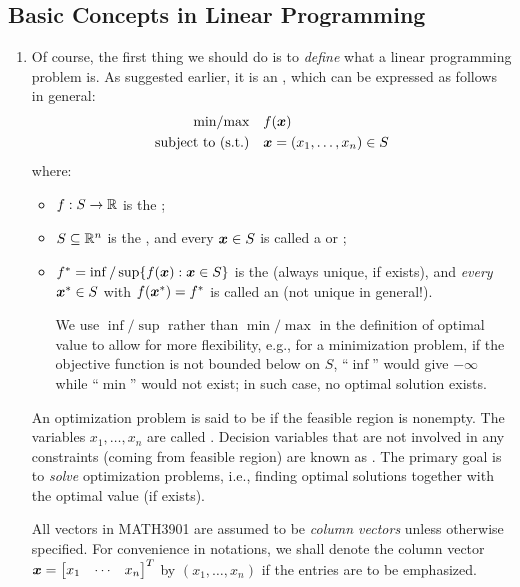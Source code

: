 \subsection{Basic Concepts in Linear Programming}
\label{subsect:lp-basic-cocnepts}
\begin{enumerate}
\item Of course, the first thing we should do is to \emph{define} what a linear
programming problem is. As suggested earlier, it is an , which can be expressed as follows in general:
\begin{align*}
\text{min/max}\quad&f(\bm{x}) \\
\text{subject to (s.t.)}\quad&\bm{x}=(x_1,\dotsc,x_n)\in S
\end{align*}
where:
\begin{itemize}
\item \(f:S\to\mathbb{R}\) is the ;
\item \(S\subseteq \mathbb{R}^n\) is the , and every \(\bm{x}\in S\) is called a  or ;
\item \(f^*=\inf/\sup\{f(\bm{x}):\bm{x}\in S\}\) is the  (always unique, if exists), and \emph{every}
\(\bm{x}^{*}\in S\) with \(f(\bm{x}^{*})=f^{*}\) is called an
 (not unique in general!).
\begin{note}
We use \(\inf/\sup\) rather than \(\min/\max\) in the definition of optimal
value to allow for more flexibility, e.g., for a minimization problem, if the
objective function is not bounded below on \(S\), ``\(\inf\)'' would give
\(-\infty\) while ``\(\min\)'' would not exist; in such case, no optimal
solution exists.
\end{note}
\end{itemize}
An optimization problem is said to be  if the feasible region is
nonempty. The variables \(x_1,\dotsc,x_n\) are called .  Decision variables that are not involved in any constraints
(coming from feasible region) are known as . The primary
goal is to \emph{solve} optimization problems, i.e., finding optimal solutions
together with the optimal value (if exists).

All vectors in MATH3901 are assumed to be \emph{column vectors} unless
otherwise specified. For convenience in notations, we shall denote the column
vector \(\bm{x}= \begin{bmatrix}x_1&\cdots&x_n\end{bmatrix}^{T}\) by
\((x_1,\dotsc,x_n)\) if the entries are to be emphasized.


\end{enumerate}
